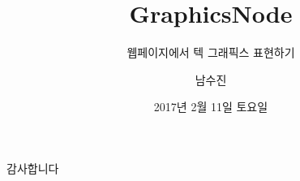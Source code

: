 \documentclass{beamer}
\title{GraphicsNode}
\subtitle{웹페이지에서 텍 그래픽스 표현하기}
\date{2017년 2월 11일 토요일}
\author{남수진}
\institute{
  2017 한국텍학회 학술대회 및 정기총회 \\
  동국대학교 법학관 B253호}
\begin{document}
\maketitle

\begin{frame}[standout]
  감사합니다
\end{frame}
\end{document}
